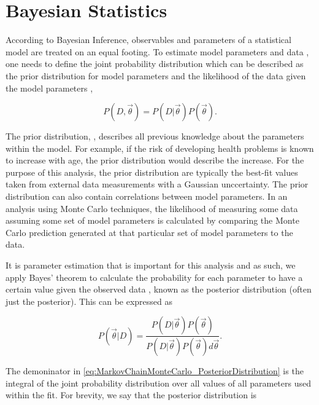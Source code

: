 \section{Bayesian Statistics}
\label{sec:MarkovChainMonteCarlo_BayesianStatistics}
According to Bayesian Inference, observables and parameters of a statistical model are treated on an equal footing. To estimate model parameters \quickmath{\vec{\theta}} and data , one needs to define the joint probability distribution  which can be described as the prior distribution for model parameters  and the likelihood of the data given the model parameters ,

\begin{equation}
  P(D,\vec{\theta}) = P(D|\vec{\theta})P(\vec{\theta}).
\end{equation}

The prior distribution, , describes all previous knowledge about the parameters within the model. For example, if the risk of developing health problems is known to increase with age, the prior distribution would describe the increase. For the purpose of this analysis, the prior distribution are typically the best-fit values taken from external data measurements with a Gaussian unccertainty. The prior distribution can also contain correlations between model parameters. In an analysis using Monte Carlo techniques, the likelihood of measuring some data assuming some set of model parameters is calculated by comparing the Monte Carlo prediction generated at that particular set of model parameters to the data.

It is parameter estimation that is important for this analysis and as such, we apply Bayes' theorem  to calculate the probability for each parameter to have a certain value given the observed data , known as the posterior distribution (often just the posterior). This can be expressed as

\begin{equation}
  \label{eq:MarkovChainMonteCarlo_PosteriorDistribution}
  P(\vec{\theta}|D) = \frac{ P(D|\vec{\theta}) P(\vec{\theta}) }{ P(D|\vec{\theta}) P(\vec{\theta}) d\vec{\theta}}.
\end{equation}

The demoninator in \autoref{eq:MarkovChainMonteCarlo_PosteriorDistribution} is the integral of the joint probability distribution over all values of all parameters used within the fit. For brevity, we say that the posterior distribution is


